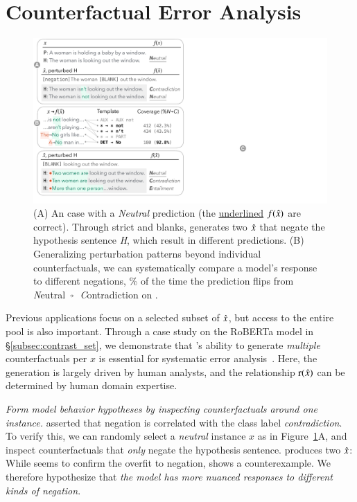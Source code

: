 \section{Counterfactual Error Analysis}
\label{sec:err_analysis}


\begin{figure}[t]
\centering
\includegraphics[trim={0 12.5cm 33cm 0cm},clip,width=1\columnwidth]{figures/err_analysis.pdf}
\vspace{-15pt}
\caption{
(A) An \nli case with a \emph{Neutral} prediction (the \uline{underlined} $f(\hat{x})$ are correct).
Through strict \tagstrs and blanks, \sysname generates two $\hat{x}$ that negate the hypothesis sentence \emph{H}, which result in different predictions.
(B) Generalizing perturbation patterns beyond individual counterfactuals, we can systematically compare a model's response to different negations, \% of the time the prediction flips from \emph{N}eutral~$\veryshortarrow$~\emph{C}ontradiction on .
}
\vspace{-10pt}
\label{fig:err_analysis}
\end{figure}


Previous applications focus on a selected subset of $\hat{x}$, but access to the entire pool is also important.
Through a case study on the \nli RoBERTa model in \S\ref{subsec:contrast_set}, we demonstrate that \sysname's ability to generate \emph{multiple} counterfactuals per $x$ is essential for systematic error analysis~\cite{wu2019errudite}.
Here, the generation is largely driven by human analysts, and the relationship $\operatorname*{r}(\hat{x})$ can be determined by human domain expertise.

\emph{Form model behavior hypotheses by inspecting counterfactuals around one instance.}
\citet{gururangan2018annotation} asserted that negation is correlated with the class label \emph{contradiction}. 
To verify this, we can randomly select a \emph{neutral} instance $x$ as in Figure~\ref{fig:err_analysis}A, and inspect counterfactuals that \emph{only} negate the hypothesis sentence.
\sysname produces two $\hat{x}$:
While  seems to confirm the overfit to negation,  shows a counterexample. 
We therefore hypothesize that
\emph{the model has more nuanced responses to different kinds of negation}.

